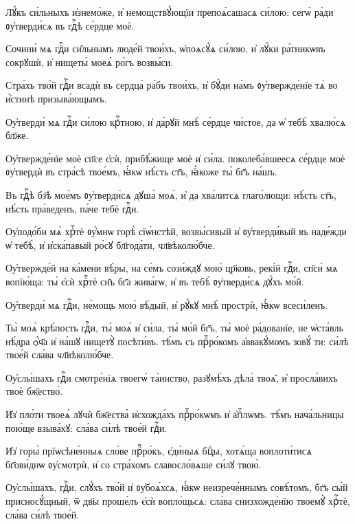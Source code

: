 \hKv Лꙋ́къ си́льныхъ и҆знемо́же, и҆ немощствꙋ́ющїи  препоѧ́сашасѧ си́лою: сегѡ̀ ра́ди  ᲂу҆тверди́сѧ въ гдⷭ҇ѣ се́рдце моѐ. 

\hKv Сочини́ мѧ гдⷭ҇и си̑льнымъ люде́й твои́хъ, ѡ҆поѧсꙋ́ѧ си́лою,  и҆ лꙋ́ки ра́тникѡвъ сокрꙋшѝ, и҆ нищеты̀ моеѧ̀ ро́гъ  возвы́си. 

\hKv Стра́хъ тво́й гдⷭ҇и всадѝ въ сердца̀ ра́бъ твои́хъ, и҆  бꙋ́ди на́мъ ᲂу҆твержде́нїе тѧ̀ во и҆́стинѣ призыва́ющымъ. 

\hKv Оу҆тверди́ мѧ гдⷭ҇и си́лою крⷭ҇тною, и҆ да́рꙋй мнѣ̀  се́рдце чи́стое, да ѡ҆ тебѣ̀ хвалю́сѧ бл҃же. 

\hKv Оу҆твержде́нїе моѐ сп҃се є҆сѝ, прибѣ́жище моѐ и҆  си́ла. поколеба́вшеесѧ се́рдце моѐ ᲂу҆твердѝ въ стра́сѣ  твое́мъ, ꙗ҆́кѡ нѣ́сть ст҃ъ, ꙗ҆́коже ты̀ бг҃ъ на́шъ. 

\hKv Въ гдⷭ҇ѣ бз҃ѣ мое́мъ ᲂу҆тверди́сѧ дꙋша̀ моѧ̀, и҆ да  хва́литсѧ глаго́лющи: нѣ́сть ст҃ъ, нѣ́сть пра́веденъ,  па́че тебѐ гдⷭ҇и. 

\hKv Оу҆подо́би мѧ̀ хрⷭ҇тѐ ᲂу҆́мнѡ горѣ̀ сїѡ́нстѣй,  возвы́сивый и҆ ᲂу҆тверди́вый въ наде́жди ѡ҆ тебѣ̀, и҆  и҆ска́павый ро́сꙋ бл҃года́ти, чл҃вѣколю́бче.  

\hKv Оу҆твержде́й на ка́мени вѣ́ры, на се́мъ сози́ждꙋ мою̀  цр҃ковь, рекі́й гдⷭ҇и, сп҃си́ мѧ вопїю́ща: ты̀ є҆сѝ  хрⷭ҇тѐ сн҃ъ бг҃а жива́гѡ, и҆ въ тебѣ̀ ᲂу҆тверди́сѧ дꙋ́хъ  мо́й. 

\hKv Оу҆тверди́ мѧ гдⷭ҇и, не́мощь мою̀ вѣ́дый, и҆ рꙋ́кꙋ мнѣ̀  прострѝ, ꙗ҆́кѡ всеси́ленъ. 
%

\hKv Ты̀ моѧ̀ крѣ́пость гдⷭ҇и, ты̀ моѧ̀ и҆ си́ла, ты̀ мо́й бг҃ъ,  ты̀ моѐ ра́дованїе, не ѡ҆ста́вль нѣ́дра ѻ҆́ч҃а и҆ на́шꙋ  нищетꙋ̀ посѣти́въ. тѣ́мъ съ прⷪ҇ро́комъ а҆ввакꙋ́момъ зовꙋ́  ти: си́лѣ твое́й сла́ва чл҃вѣколю́бче. 
%

\hKv Оу҆слы́шахъ гдⷭ҇и смотре́нїѧ твоегѡ̀  та́инство, разꙋмѣ́хъ дѣла̀ твоѧ̑, и҆ просла́вихъ твоѐ  бж҃ество̀. 
%

\hKv И҆з̾ пло́ти твоеѧ̀ лꙋчѝ бж҃ества̀ и҆схожда́хъ прⷪ҇ро́кѡмъ  и҆ а҆пⷭ҇лѡмъ. тѣ́мъ нача́льницы пою́ще взыва́хꙋ: сла́ва  си́лѣ твое́й гдⷭ҇и.  
%

\hKv И҆з̾ горы̀ прїѡсѣне́нныѧ сло́ве прⷪ҇ро́къ, є҆ди́ныѧ  бцⷣы, хотѧ́ща воплоти́тисѧ бг҃ови́днѡ ᲂу҆смотрѝ, и҆ со  стра́хомъ славосло́вѧше си́лꙋ твою̀. 

\hKv Оу҆слы́шахъ, гдⷭ҇и, слꙋ́хъ тво́й и҆ ᲂу҆боѧ́хсѧ, ꙗ҆́кѡ  неизрече́ннымъ совѣ́томъ, бг҃ъ сы́й присносꙋ́щный, ѿ дв҃ы  проше́лъ є҆сѝ вопло́щьсѧ: сла́ва снизхожде́нїю твоемꙋ̀  хрⷭ҇тѐ, сла́ва си́лѣ твое́й. 

